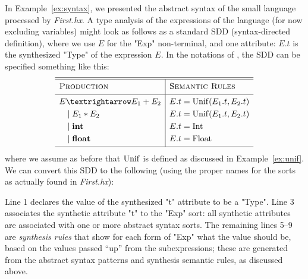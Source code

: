 \documentclass[11pt]{article} %
\begin{document}
\begin{example}\label{ex:collect}
  In Example~\ref{ex:syntax}, we presented the abstract syntax of the small language processed by
  \emph{First.hx}. A type analysis of the expressions of the language (for now excluding variables)
  might look as follows as a standard SDD (syntax-directed definition), where we use $E$ for the
  "Exp" non-terminal, and one attribute: $E.t$ is the synthesized "Type" of the expression $E$.  In
  the notations of \cite{Aho+:2006}, the SDD can be specified something like this:
  \begin{equation*}
    \begin{array}{l|l}
      \hline
      \hline
      \textsc{Production}  & \textsc{Semantic Rules} \Bigstrut\\
      \hline
      E → E_1 + E_2 & E.t = \op{Unif}(E_1.t, E_2.t) \Bigstrut\\[\jot]
      \quad\mid E_1 \ast E_2 & E.t = \op{Unif}(E_1.t, E_2.t) \\[\jot]
      \quad\mid \textbf{int} & E.t = \op{Int} \\[\jot]
      \quad\mid \textbf{float} & E.t = \op{Float} \\[\jot]
      \hline
    \end{array}
  \end{equation*}
  where we assume as before that $\operatorname{Unif}$ is defined as discussed in Example~\ref{ex:unif}.
  We can convert this SDD to the following \HAX (using the proper names for the sorts as actually
  found in \emph{First.hx}):
  Line 1 declares the value of the synthesized "t" attribute to be a "Type".
  Line 3 associates the synthetic attribute "t" to the "Exp" sort: all synthetic attributes are
  associated with one or more abstract syntax sorts.
  The remaining lines 5--9 are \emph{synthesis rules} that show for each form of "Exp" what the
  value should be, based on the values passed ``up'' from the subexpressions; these are generated
  from the abstract syntax patterns and synthesis semantic rules, as discussed above.
\end{example}
\end{document}
